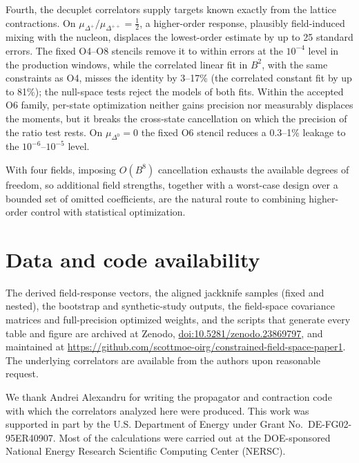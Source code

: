 \documentclass[aps,prd,reprint,twocolumn,superscriptaddress,nofootinbib,longbibliography]{revtex4-2}
\begin{document}
Fourth, the decuplet correlators supply targets known exactly from the lattice contractions. On $\mu_{\Delta^+}/\mu_{\Delta^{++}}=\tfrac12$, a higher-order response, plausibly field-induced mixing with the nucleon, displaces the lowest-order estimate by up to 25 standard errors. The fixed O4--O8 stencils remove it to within errors at the $10^{-4}$ level in the production windows, while the correlated linear fit in $B^2$, with the same constraints as O4, misses the identity by 3--17\% (the correlated constant fit by up to 81\%); the null-space tests reject the models of both fits. Within the accepted O6 family, per-state optimization neither gains precision nor measurably displaces the moments, but it breaks the cross-state cancellation on which the precision of the ratio test rests. On $\mu_{\Delta^0}=0$ the fixed O6 stencil reduces a 0.3--1\% leakage to the $10^{-6}$--$10^{-5}$ level.

With four fields, imposing $O(B^8)$ cancellation exhausts the available degrees of freedom, so additional field strengths, together with a worst-case design over a bounded set of omitted coefficients, are the natural route to combining higher-order control with statistical optimization.

\section*{Data and code availability}

The derived field-response vectors, the aligned jackknife samples (fixed and nested), the bootstrap and synthetic-study outputs, the field-space covariance matrices and full-precision optimized weights, and the scripts that generate every table and figure are archived at Zenodo, \href{https://doi.org/10.5281/zenodo.23869797}{doi:10.5281/zenodo.23869797}, and maintained at \url{https://github.com/scottmoe-oirg/constrained-field-space-paper1}. The underlying correlators are available from the authors upon reasonable request.

\begin{acknowledgments}
We thank Andrei Alexandru for writing the propagator and contraction code with which the correlators analyzed here were produced. This work was supported in part by the U.S. Department of Energy under Grant No.~DE-FG02-95ER40907. Most of the calculations were carried out at the DOE-sponsored National Energy Research Scientific Computing Center (NERSC).
\end{acknowledgments}
\end{document}
